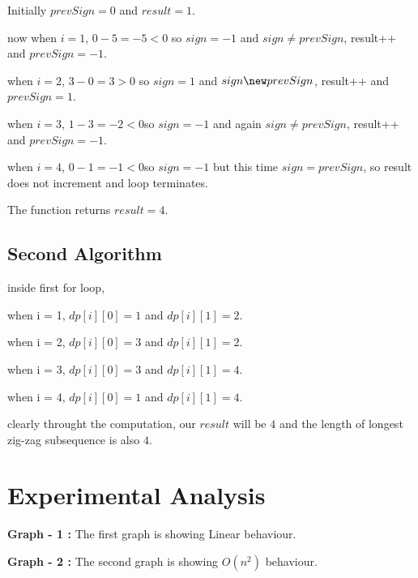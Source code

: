 \documentclass[conference]{IEEEtran}
\begin{document}
Initially $prevSign=0$ and $result =1$.

now when $i=1$, $0-5=-5 < 0 $ so $sign = -1$ and $sign\neq prevSign$, result++ and $prevSign=-1$.

when $i=2$, $3-0=3 > 0$ so $sign = 1$ and $sign\new prevSign$, result++ and $prevSign=1$.

when $i=3$, $1-3=-2<0$so $sign=-1$ and again $sign\neq prevSign$, result++ and $prevSign=-1$.

when $i=4$, $0-1=-1<0$so $sign=-1$ but this time $sign=prevSign$, so result does not increment and loop terminates.

The function returns $result=4$.

\subsection{Second Algorithm}
inside first for loop,

when i = 1, $dp[i][0] = 1$ and $dp[i][1] =2$.

when i = 2, $dp[i][0] = 3$ and $dp[i][1] = 2$.

when i = 3, $dp[i][0] = 3$ and $dp[i][1] = 4$.

when i = 4, $dp[i][0] = 1$ and $dp[i][1] = 4$.

clearly throught the computation, our $result$ will be $4$ and the length of longest zig-zag subsequence is also $4$.

\section{Experimental Analysis}


\textbf{Graph - 1 : } The first graph is showing Linear behaviour.

\textbf{Graph - 2 : } The second graph is showing $O(n^2)$ behaviour.

\begin{flushleft}

\end{flushleft}
\end{document}
